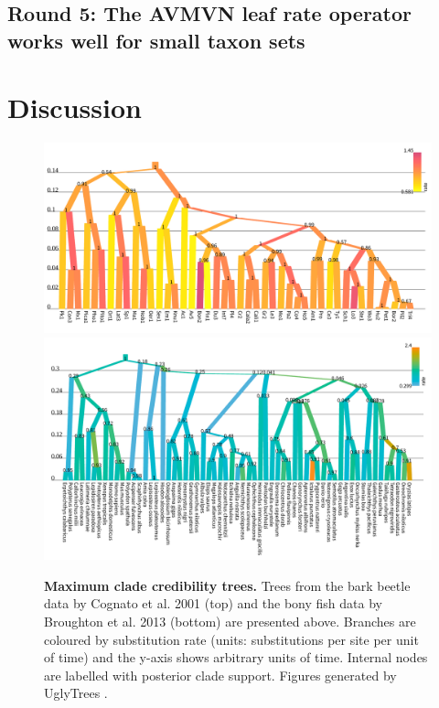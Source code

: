 \documentclass[10pt,letterpaper]{article}
\begin{document}
\subsection*{Round 5: The AVMVN leaf rate operator works well for small taxon sets}





\section*{Discussion} \label{sect:discussion}






\begin{figure}[!h]
\includegraphics[width=\textwidth]{Figures/cognato.pdf}
\includegraphics[width=\textwidth]{Figures/broughton.pdf}
\caption{\textbf{Maximum clade credibility trees.} Trees from the bark beetle data by Cognato et al. 2001 \cite{Cognato_2001} (top) and the bony fish data by Broughton et al. 2013 \cite{Broughton_2013} (bottom) are presented above. Branches are coloured by substitution rate (units: substitutions per site per unit of time) and the y-axis shows arbitrary units of time. Internal nodes are labelled with posterior clade support. Figures generated by UglyTrees \cite{uglytrees}.  }
\label{fig:parameterisationResults}
\end{figure}
\end{document}
